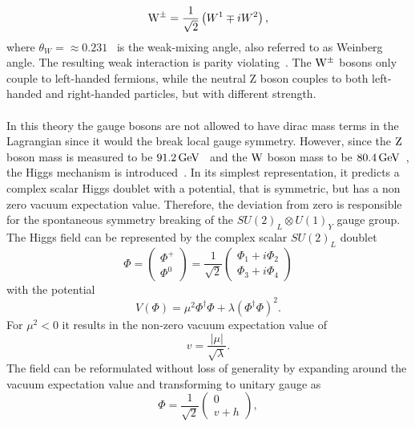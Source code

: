 \begin{equation}
 \mathrm{W}^\pm = \frac{1}{\sqrt{2}}\left(W^1\mp i W^2\right),
\end{equation}
where $\theta_W=\approx0.231$~\cite{PDG} is the weak-mixing angle, also referred to as Weinberg angle.
The resulting weak interaction is parity violating~\cite{Wu,Goldhaber}. The $\mathrm{W}^\pm$ bosons only couple to left-handed fermions, while the neutral Z boson couples to both left-handed and right-handed particles, but with different strength.\\
\\In this theory the gauge bosons are not allowed to have dirac mass terms in the Lagrangian since it would the break local gauge symmetry. However, since the $\mathrm{Z}$ boson mass is measured to be $91.2\,\text{Ge\hspace{-.08em}V}$~\cite{PDG} and the $\mathrm{W}$ boson mass to be $80.4\,\text{Ge\hspace{-.08em}V}$~\cite{PDG}, the Higgs mechanism is introduced~\cite{Higgs1,Higgs2,Higgs3}. In its simplest representation, it predicts a complex scalar Higgs doublet with a potential, that is symmetric, but has a non zero vacuum expectation value. Therefore, the deviation from zero is responsible for the spontaneous symmetry breaking of the $ SU(2)_L\otimes U(1)_Y$ gauge group. The Higgs field can be represented by the complex scalar $SU(2)_L$ doublet
\begin{equation}
 \Phi=
 \left(\begin{matrix}
   \Phi^{+} \\
   \Phi^0
  \end{matrix}
 \right)
 =
 \frac{1}{\sqrt{2}}
 \left(\begin{matrix}
   \Phi_1 + i \Phi_2 \\
   \Phi_3 + i\Phi_4
  \end{matrix}
 \right)
\end{equation}
with the potential
\begin{equation}
 V(\Phi)=\mu^2 \Phi^{\dagger}\Phi+\lambda\left(\Phi^{\dagger}\Phi\right)^2.
\end{equation}
For $\mu^2<0$ it results in the non-zero vacuum expectation value of
\begin{equation}
 v = \frac{|\mu|}{\sqrt{\lambda}}.
\end{equation}
The field can be reformulated without loss of generality by expanding around the vacuum expectation value and transforming to unitary gauge as
\begin{equation}
 \Phi = \frac{1}{\sqrt{2}}
 \left(\begin{matrix}
   0 \\
   v+h
  \end{matrix}
 \right),
\end{equation}
